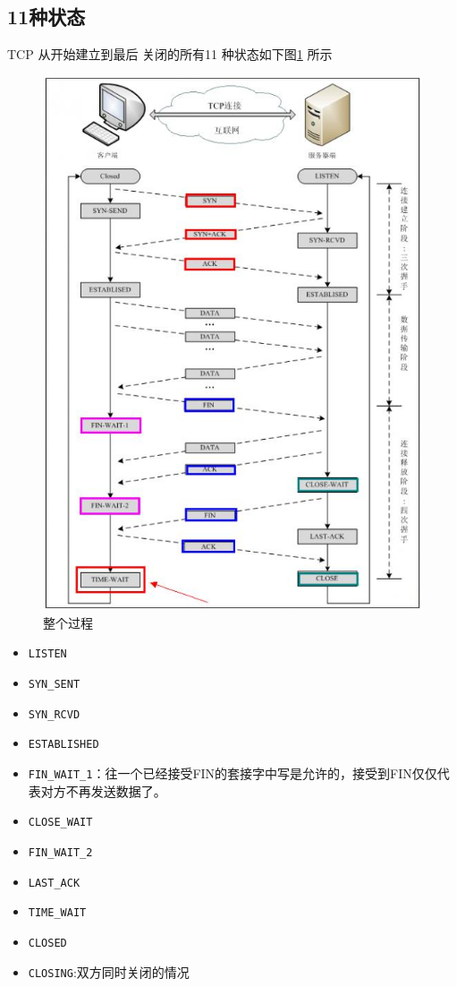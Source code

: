 \documentclass[UTF8,a4paper,12pt]{ctexbook}
\begin{document}
		\subsection{11种状态}
			TCP 从开始建立到最后 关闭的所有11 种状态如下图\ref{allstatus} 所示
			\begin{figure}[ht]
				\centering
				\includegraphics[scale = 0.5]{figures/TCP-status.jpg}
				\caption{整个过程}
				\label{allstatus}
			\end{figure}
			
			\newpage		
			\begin{itemize}
				\item \verb|LISTEN|
				\item \verb|SYN_SENT|
				\item \verb|SYN_RCVD|
				\item \verb|ESTABLISHED|
				\item \verb|FIN_WAIT_1|：往一个已经接受FIN的套接字中写是允许的，接受到FIN仅仅代表对方不再发送数据了。
				\item \verb|CLOSE_WAIT|
				\item \verb|FIN_WAIT_2|
				\item \verb|LAST_ACK|
				\item \verb|TIME_WAIT|
				\item \verb|CLOSED|
				\item \verb|CLOSING|:双方同时关闭的情况
			\end{itemize}
\end{document}
